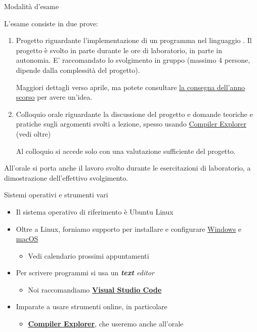 \begin{frame}{Modalità d'esame}

  L'esame consiste in due prove:

  \begin{enumerate}

  \item Progetto riguardante l'implementazione di un programma nel linguaggio
    \Cpp{}. Il progetto è svolto in parte durante le ore di laboratorio, in
    parte in autonomia. E' raccomandato lo svolgimento in gruppo (massimo 4
    persone, dipende dalla complessità del progetto).

    Maggiori dettagli verso aprile, ma potete consultare
    \href{https://github.com/Programmazione-per-la-Fisica/progetto2023}{la
      consegna dell'anno scorso} per avere un'idea.

  \item Colloquio orale riguardante la discussione del progetto e domande
    teoriche e pratiche sugli argomenti svolti a lezione, spesso usando
    \href{https://godbolt.org/}{Compiler Explorer} (vedi oltre)

    Al colloquio si accede solo con una valutazione sufficiente del progetto.

  \end{enumerate}

  All'orale si porta anche il lavoro svolto durante le esercitazioni di
  laboratorio, a dimostrazione dell'effettivo svolgimento.

\end{frame}

\begin{frame}{Sistemi operativi e strumenti vari}
  \begin{itemize}[<+->]
  \item Il sistema operativo di riferimento è Ubuntu Linux
  \item Oltre a Linux, forniamo supporto per installare e configurare
    \href{https://github.com/Programmazione-per-la-Fisica/howto/blob/main/other-OSes/WSLGuide.md}{Windows}
    e
    \href{https://github.com/Programmazione-per-la-Fisica/howto/blob/main/other-OSes/macOSGuide.md}{macOS}
      \begin{itemize}
      \item Vedi calendario prossimi appuntamenti
      \end{itemize}
  \item Per scrivere programmi si usa un \textit{\textbf{text} editor}
    \begin{itemize}[<.->]
    \item Noi raccomandiamo \href{https://code.visualstudio.com/}{\textbf{Visual
          Studio Code}}
    \end{itemize}
  \item Imparate a usare strumenti online, in particolare
    \begin{itemize}[<.->]
    \item \href{https://godbolt.org/}{\textbf{Compiler Explorer}}, che useremo
      anche all'orale
    \end{itemize}
  \end{itemize}

\end{frame}

